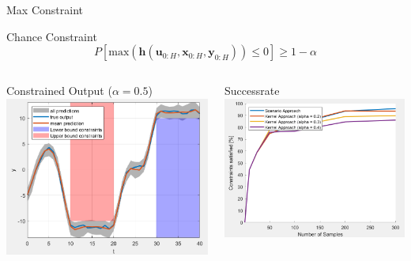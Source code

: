 \documentclass[student, noshadow, itr, english, aspectratio=169]{ITR_LSR_slides}
\begin{document}
\begin{frame}{Max Constraint}

\begin{block}{Chance Constraint}
	\begin{equation*}
		P \left[ \text{max}(\boldsymbol{h}(\boldsymbol{u}_{0:H},  \boldsymbol{x}_{0:H},  \boldsymbol{y}_{0:H})) \leq 0 \right] \geq 1 - \alpha
	\end{equation*}
\end{block}	

\begin{columns}[onlytextwidth, T]
		\begin{column}{.5\textwidth}
			\;\; Constrained Output ($\alpha = 0.5$)
			\includegraphics[width= .9\textwidth]{MaxConstraint_pic1}
		\end{column}

		\begin{column}{.5\textwidth}
			\;\; Successrate
			\includegraphics[width= .9\textwidth]{MaxConstraint_pic2}
		\end{column}
\end{columns}
\end{frame}	
\end{document}
